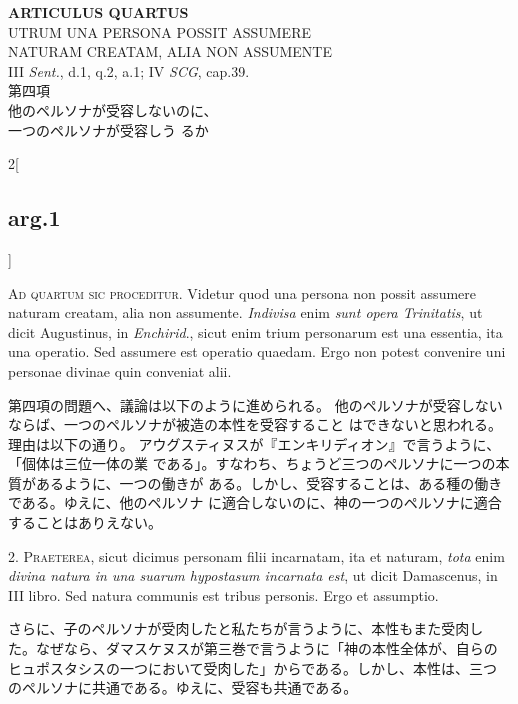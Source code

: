 \documentclass[paper=a4paper,fontsize=10pt,jafontsize=9pt,titlepage]{jlreq}
\begin{document}
\begin{center}
 {\Large {\bfseries ARTICULUS QUARTUS}}\\
 {\large UTRUM UNA PERSONA POSSIT ASSUMERE\\NATURAM CREATAM, ALIA NON ASSUMENTE}\\
 {\footnotesize III {\itshape Sent.}, d.1, q.2, a.1; IV {\itshape SCG}, cap.39.}\\
 {\Large 第四項\\他のペルソナが受容しないのに、\\一つのペルソナが受容しう
 るか}
\end{center}

\begin{paracol}{2}[\subsection{arg.1}]

{\Huge A}{\scshape d quartum sic proceditur}. Videtur quod una persona non possit assumere
naturam creatam, alia non assumente. {\itshape Indivisa} enim {\itshape sunt opera
Trinitatis}, ut dicit Augustinus, in {\itshape Enchirid}., sicut enim trium
personarum est una essentia, ita una operatio. Sed assumere est operatio
quaedam. Ergo non potest convenire uni personae divinae quin conveniat
alii.

\switchcolumn

第四項の問題へ、議論は以下のように進められる。
他のペルソナが受容しないならば、一つのペルソナが被造の本性を受容すること
 はできないと思われる。理由は以下の通り。
アウグスティヌスが『エンキリディオン』で言うように、「個体は三位一体の業
 である」。すなわち、ちょうど三つのペルソナに一つの本質があるように、一つの働きが
 ある。しかし、受容することは、ある種の働きである。ゆえに、他のペルソナ
 に適合しないのに、神の一つのペルソナに適合することはありえない。


2. {\scshape Praeterea}, sicut dicimus personam filii incarnatam, ita et naturam, {\itshape tota}
enim {\itshape divina natura in una suarum hypostasum incarnata est}, ut dicit
Damascenus, in III libro. Sed natura communis est tribus personis. Ergo
et assumptio.

\switchcolumn

さらに、子のペルソナが受肉したと私たちが言うように、本性もまた受肉し
 た。なぜなら、ダマスケヌスが第三巻で言うように「神の本性全体が、自らの
 ヒュポスタシスの一つにおいて受肉した」からである。しかし、本性は、三つ
 のペルソナに共通である。ゆえに、受容も共通である。


\end{paracol}
\end{document}
